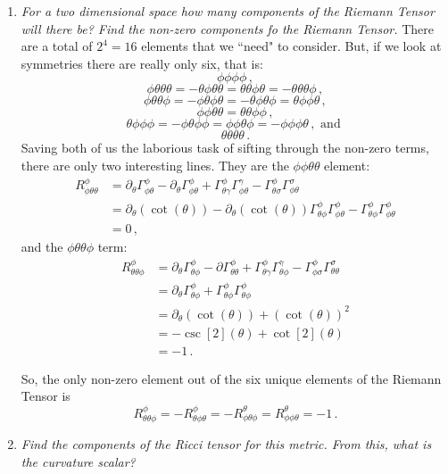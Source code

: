 \documentclass[11pt]{article}
\begin{document}
\begin{enumerate}[label=\alph*)]
\item \textit{For a two dimensional space how many components of the Riemann Tensor will there be? Find the non-zero components fo the Riemann Tensor.}
There are a total of $2^4=16$ elements that we ``need" to consider. But, if we look at symmetries there are really only six, that is:
\[\phi\phi\phi\phi \, ,\]
\[\phi\theta\theta\theta = -\theta\phi\theta\theta = \theta\theta\phi\theta = - \theta \theta \theta \phi \, ,\]
\[\phi\theta\theta\phi = - \phi\theta\phi\theta = - \theta\phi \theta \phi = \theta\phi \phi \theta\, ,\]
\[\phi\phi\theta\theta = \theta \theta\phi\phi\, ,\]
\[\theta\phi\phi\phi = -\phi\theta\phi\phi = \phi\phi\theta\phi = -\phi\phi\phi\theta \, , \text{ and }\]
\[\theta\theta\theta\theta \, . \]
Saving both of us the laborious task of sifting through the non-zero terms, there are only two interesting lines. They are the $\phi\phi\theta\theta$ element:
\begin{align*}
R^\phi_{\phi\theta\theta} & = \partial_\theta \Gamma^\phi_{\phi\theta} - \partial_\theta \Gamma^\phi_{\phi\theta} + \Gamma^\phi_{\theta\gamma}\Gamma^\gamma_{\phi\theta} - \Gamma^\phi_{\theta\sigma}\Gamma^\sigma_{\phi\theta}\\
& = \partial_\theta(\cot(\theta))-\partial_\theta(\cot(\theta)) \Gamma^\phi_{\theta\phi}\Gamma^\phi_{\phi\theta} - \Gamma^\phi_{\theta\phi}\Gamma^\phi_{\phi\theta} \\ 
& = 0 \, ,
\end{align*}
and the $\phi\theta\theta\phi$ term:
\begin{align*}
R^\phi_{\theta\theta\phi} &= \partial_\theta\Gamma^\phi_{\theta\phi} - \partial\Gamma^\phi_{\theta\theta} + \Gamma^\phi_{\theta\gamma}\Gamma^\gamma_{\theta\phi} - \Gamma^\phi_{\phi\sigma}\Gamma^\sigma_{\theta\theta}\\
& = \partial_\theta\Gamma^\phi_{\theta\phi} + \Gamma^\phi_{\theta\phi}\Gamma^\phi_{\theta\phi}\\
& = \partial_\theta\left(\cot(\theta)\right) + \left(\cot(\theta)\right)^2\\
& = -\csc[2](\theta)+ \cot[2](\theta)\\
& = -1 \, .
\end{align*}

So, the only non-zero element out of the six unique elements of the Riemann Tensor is 
\[R^\phi_{\theta\theta\phi} = -R^\phi_{\theta\phi\theta} = -R^\theta_{\phi\theta\phi} = R^\theta_{\phi\phi\theta} = -1 \, .\]

\item \textit{Find the components of the Ricci tensor for this metric. From this, what is the curvature scalar?}


\end{enumerate}
\end{document}
